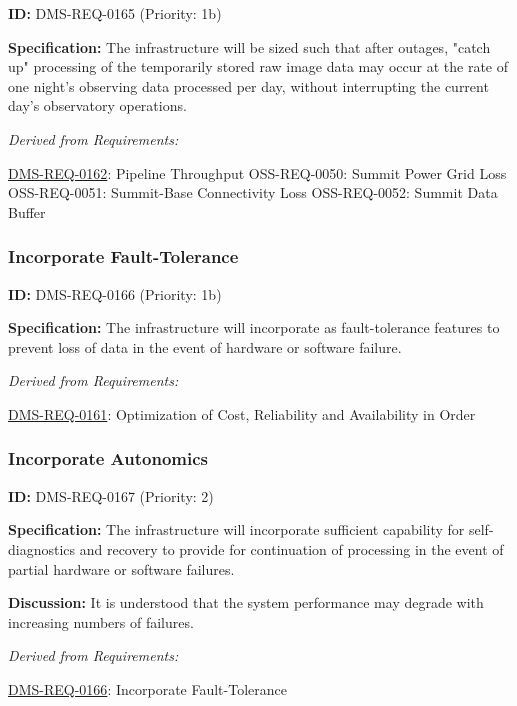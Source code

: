 \documentclass[SE,toc,lsstdraft]{lsstdoc}
\begin{document}
\label{DMS-REQ-0165}
\textbf{ID:} DMS-REQ-0165 (Priority: 1b)

    \textbf{Specification: }The infrastructure will be sized such that after outages, "catch up" processing of the temporarily stored raw image data may occur at the rate of one night’s observing data processed per day, without interrupting the current day's observatory operations.

\emph{Derived from Requirements:}

\hyperref[DMS-REQ-0162]{DMS-REQ-0162}:
Pipeline Throughput \newline
OSS-REQ-0050:
Summit Power Grid Loss \newline
OSS-REQ-0051:
Summit-Base Connectivity Loss \newline
OSS-REQ-0052:
Summit Data Buffer \newline

\subsubsection{Incorporate Fault-Tolerance}

\label{DMS-REQ-0166}
\textbf{ID:} DMS-REQ-0166 (Priority: 1b)

\textbf{Specification: }The infrastructure will incorporate as fault-tolerance features to prevent loss of data in the event of hardware or software failure.

\emph{Derived from Requirements:}

\hyperref[DMS-REQ-0161]{DMS-REQ-0161}:
Optimization of Cost, Reliability and Availability in Order \newline

\subsubsection{Incorporate Autonomics}

\label{DMS-REQ-0167}
\textbf{ID:} DMS-REQ-0167 (Priority: 2)

\textbf{Specification:} The infrastructure will incorporate sufficient capability for self-diagnostics and recovery to provide for continuation of processing in the event of partial hardware or software failures.

\textbf{Discussion: }It is understood that the system performance may degrade with increasing numbers of failures.

\emph{Derived from Requirements:}

\hyperref[DMS-REQ-0166]{DMS-REQ-0166}:
Incorporate Fault-Tolerance \newline
\end{document}
